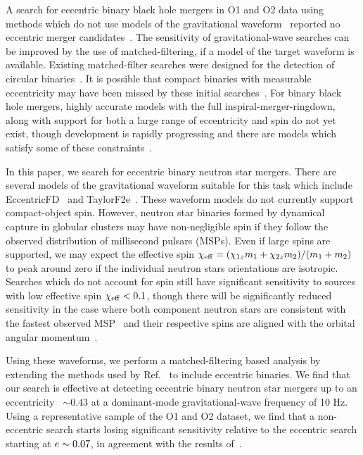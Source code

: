A search for eccentric binary black hole mergers in O1 and O2 data using methods which do not use models of the gravitational waveform~\cite{Klimenko:2008fu,Klimenko:2015ypf,Tiwari:2015gal} reported no eccentric merger candidates~\cite{Salemi:2019owp}. The sensitivity of gravitational-wave searches can be improved by the use of matched-filtering, if a model of the target waveform is available. Existing matched-filter searches were designed for the detection of circular  binaries~\cite{DalCanton:2017ala,Usman:2015kfa,Venumadhav:2019tad}. It is possible that compact binaries with measurable eccentricity may have been missed by these initial searches~\cite{Brown:2009ng,Huerta:2013qb}. For binary black hole mergers, highly accurate models with the full inspiral-merger-ringdown, along with support for both a large range of eccentricity and spin do not yet exist, though development is rapidly progressing and there are models which satisfy some of these constraints~\cite{Huerta:2017kez,Cao:2017ndf,Hinderer:2017jcs,Hinder:2017sxy,Ireland:2019tao}.

In this paper, we search for eccentric binary neutron star mergers.  There are several models of the gravitational waveform suitable for this task which include EccentricFD~\cite{Huerta:2014eca} and TaylorF2e~\cite{Moore:2018kvz,Moore:2019xkm}. These waveform models do not currently support compact-object spin. However, neutron star binaries formed by dynamical capture in globular clusters may have non-negligible spin if they follow the observed distribution of millisecond pulsars (MSPs). Even if large spins are supported, we may expect the  effective spin $\chi_{\mathrm{eff}} = (\chi_{1z} m_1 + \chi_{2z} m_2)/(m_1+m_2)$ to peak around zero if the individual neutron stars orientations are isotropic. Searches which do not account for spin still have significant sensitivity to sources with low effective spin $\chi_{\mathrm{eff}} < 0.1$, though there will be significantly reduced sensitivity in the case where both component neutron stars are consistent with the fastest observed MSP~\cite{Hessels:2006ze} and their respective spins are aligned with the orbital angular momentum~\cite{Brown:2012gs}.

Using these waveforms, we perform a matched-filtering based analysis by extending the methods used by Ref.~\cite{Nitz:2018imz} to include eccentric binaries. We find that our search is effective at detecting eccentric binary neutron star mergers up to an eccentricity \ecc~$\sim 0.43$ at a dominant-mode gravitational-wave frequency of 10 Hz. Using a representative sample of the O1 and O2 dataset, we find that a non-eccentric search starts losing significant sensitivity relative to the eccentric search starting at $e \sim 0.07$, in agreement with the results of~\cite{Huerta:2013qb,Moore:2019vjj}.

